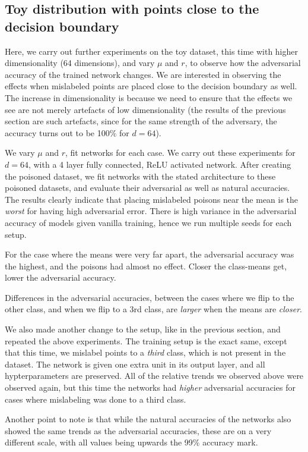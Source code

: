 \documentclass{ociamthesis}
\begin{document}
\subsection{Toy distribution with points close to the decision boundary}

Here, we carry out further experiments on the toy dataset, this time with higher
dimensionality (64 dimensions), and vary $\mu$ and $r$, to observe how the
adversarial accuracy of the trained network changes. We are interested in
observing the effects when mislabeled points are placed close to the decision
boundary as well. The increase in dimensionality is because we need to ensure
that the effects we see are not merely artefacts of low dimensionality (the
results of the previous section are such artefacts, since for the same strength
of the adversary, the accuracy turns out to be 100\% for $d=64$).

We vary $\mu$ and $r$, fit networks for each case. We carry out these
experiments for $d=64$, with a 4 layer fully connected, ReLU activated network.
After creating the poisoned dataset, we fit networks with the stated
architecture to these poisoned datasets, and evaluate their adversarial as well
as natural accuracies. The results clearly indicate that placing mislabeled
poisons near the mean is the \emph{worst} for having high adversarial error.
There is high variance in the adversarial accuracy of models given vanilla
training, hence we run multiple seeds for each setup.

For the case where the means were very far apart, the adversarial accuracy was
the highest, and the poisons had almost no effect. Closer the class-means get,
lower the adversarial accuracy.

Differences in the adversarial accuracies, between the cases where we flip to
the other class, and when we flip to a 3rd class, are \emph{larger} when the
means are \emph{closer}.

We also made another change to the setup, like in the previous section, and
repeated the above experiments. The training setup is the exact same, except
that this time, we mislabel points to a \emph{third} class, which is not present
in the dataset. The network is given one extra unit in its output layer, and all
hypterparameters are preserved. All of the relative trends we observed above
were observed again, but this time the networks had \emph{higher} adversarial
accuracies for cases where mislabeling was done to a third class.

Another point to note is that while the natural accuracies of the networks also
showed the same trends as the adversarial accuracies, these are on a very
different scale, with all values being upwards the 99\% accuracy mark.
\end{document}
